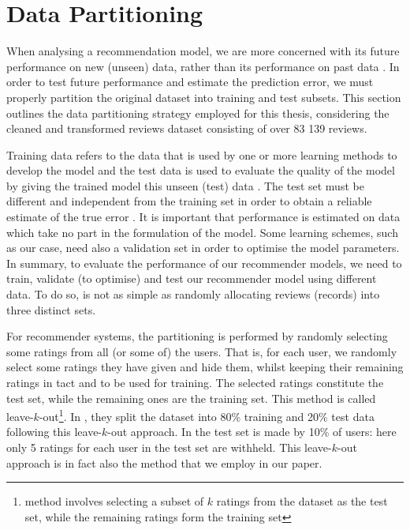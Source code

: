 \section{Data Partitioning}
\label{sec:3 Data Partitioning}

When analysing a recommendation model, we are more concerned with its future performance on new (unseen) data, rather than its performance on past data \cite{witten2005practical}. In order to test future performance and estimate the prediction error, we must properly partition the original dataset into training and test subsets. This section outlines the data partitioning strategy employed for this thesis, considering the cleaned and transformed reviews dataset consisting of over 83 139 reviews.

Training data refers to the data that is used by one or more learning methods to develop the model and the test data is used to evaluate the quality of the model by giving the trained model this unseen (test) data \cite{witten2005practical}. The test set must be different and independent from the training set in order to obtain a reliable estimate of the true error \cite{witten2005practical}. It is important that performance is estimated on data which take no part in the formulation of the model. Some learning schemes, such as our case, need also a validation set in order to optimise the model parameters. In summary, to evaluate the performance of our recommender models, we need to train, validate (to optimise) and test our recommender model using different data. To do so, is not as simple as randomly allocating reviews (records) into three distinct sets. 

For recommender systems, the partitioning is performed by randomly selecting some ratings from all (or some of) the users. That is, for each user, we randomly select some ratings they have given and hide them, whilst keeping their remaining ratings in tact and to be used for training. The selected ratings constitute the test set, while the remaining ones are the training set. This method is called leave-$k$-out\footnote{method involves selecting a subset of $k$ ratings from the dataset as the test set, while the remaining ratings form the training set}. In \cite{sarwar2002incremental}, they split the dataset into 80\% training and 20\% test data following this leave-$k$-out approach. In \cite{herlocker1999algorithmic} the test set is made by 10\% of users: here only 5 ratings for each user in the test set are withheld. This leave-$k$-out approach is in fact also the method that we employ in our paper. 

